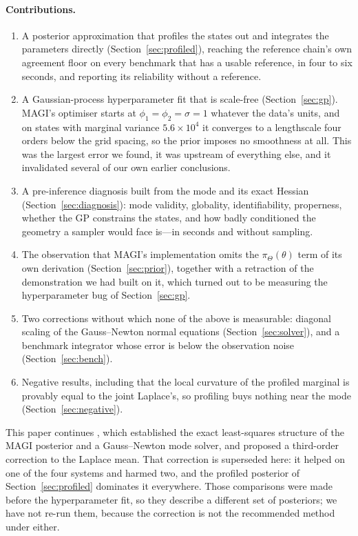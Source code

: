 \documentclass[11pt]{article}
\theoremstyle{plain}
\theoremstyle{definition}
\theoremstyle{remark}
\begin{document}
\paragraph{Contributions.}
\begin{enumerate}[leftmargin=1.5em,itemsep=1pt]
\item A posterior approximation that profiles the states out and integrates the parameters
directly (Section~\ref{sec:profiled}), reaching the reference chain's own agreement floor on every
benchmark that has a usable reference, in four to six seconds, and reporting its reliability
without a reference.
\item A Gaussian-process hyperparameter fit that is scale-free (Section~\ref{sec:gp}). MAGI's
optimiser starts at $\phi_1=\phi_2=\sigma=1$ whatever the data's units, and on states with
marginal variance $5.6\times10^4$ it converges to a lengthscale four orders below the grid
spacing, so the prior imposes no smoothness at all. This was the largest error we found, it was
upstream of everything else, and it invalidated several of our own earlier conclusions.
\item A pre-inference diagnosis built from the mode and its exact Hessian
(Section~\ref{sec:diagnosis}): mode validity, globality, identifiability, properness, whether the
GP constrains the states, and how badly conditioned the geometry a sampler would face is---in
seconds and without sampling.
\item The observation that MAGI's implementation omits the $\pi_\Theta(\theta)$ term of its own
derivation (Section~\ref{sec:prior}), together with a retraction of the demonstration we had built
on it, which turned out to be measuring the hyperparameter bug of Section~\ref{sec:gp}.
\item Two corrections without which none of the above is measurable: diagonal scaling of the
Gauss--Newton normal equations (Section~\ref{sec:solver}), and a benchmark integrator whose error
is below the observation noise (Section~\ref{sec:bench}).
\item Negative results, including that the local curvature of the profiled marginal is provably
equal to the joint Laplace's, so profiling buys nothing near the mode
(Section~\ref{sec:negative}).
\end{enumerate}

This paper continues \cite{companion}, which established the exact least-squares structure of the
MAGI posterior and a Gauss--Newton mode solver, and proposed a third-order correction to the
Laplace mean. That correction is superseded here: it helped on one of the four systems and harmed
two, and the profiled posterior of Section~\ref{sec:profiled} dominates it everywhere. Those
comparisons were made before the hyperparameter fit, so they describe a different set of
posteriors; we have not re-run them, because the correction is not the recommended method under
either.
\end{document}
